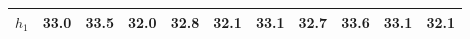 
        \begin{tabular}{c|*{10}{c}}
            \hline
            \hline
                \(h_{1}\) & 33.0 & 33.5 & 32.0 & 32.8& 32.1& 33.1& 32.7 & 33.6 & 33.1 & 32.1 \\
            \hline
            
            \hline
            \hline
        \end{tabular}
        